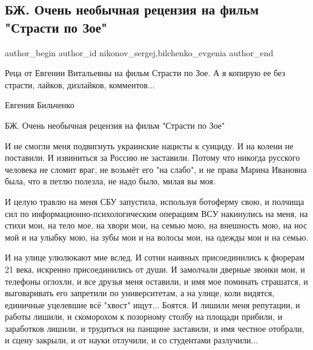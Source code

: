  
 
 
 
 
 
\subsection{БЖ. Очень необычная рецензия на фильм "Страсти по Зое"}
\label{sec:15_09_2021.fb.nikonov_sergej.2.recenzia_film_strasti_po_zoje}
 
\ifcmt
 author_begin
   author_id nikonov_sergej,bilchenko_evgenia
 author_end
\fi

Реца от Евгении Витальевны на фильм Страсти по Зое. А я копирую  ее без
страсти, лайков, дизлайков, комментов...

Евгения Бильченко

БЖ. Очень необычная рецензия на фильм "Страсти по Зое"

И не смогли меня подвигнуть украинские нацисты к суициду. И на колени не
поставили. И извиниться за Россию не заставили. Потому что никогда русского
человека не сломит враг, не возьмёт его "на слабо", и не права Марина Ивановна
была, что в петлю полезла, не надо было, милая вы моя.

И целую травлю на меня СБУ запустила, используя ботоферму свою, и полчища сил
по информационно-психологическим операциям ВСУ накинулись на меня, на стихи
мои, на тело мое, на хвори мои, на семью мою, на внешность мою, на нос мой и на
улыбку мою, на зубы мои и на волосы мои, на одежды мои и на семью. 


И на улице улюлюкают мне вслед. И сотни наивных присоединились к фюрерам 21
века, искренно присоединились от души. И замолчали дверные звонки мои, и
телефоны оглохли, и все друзья меня оставили, и имя мое поминать страшатся, и
выговаривать его запретили по университетам, а на улице, коли видятся,
единичные уцелевшие всё "хвост" ищут... Боятся. И лишили меня репутации, и
работы лишили, и скоморохом к позорному столбу на площади прибили, и заработков
лишили, и трудиться на панщине заставили, и имя честное отобрали, и сцену
закрыли, и от науки отлучили, и со студентами разлучили...

